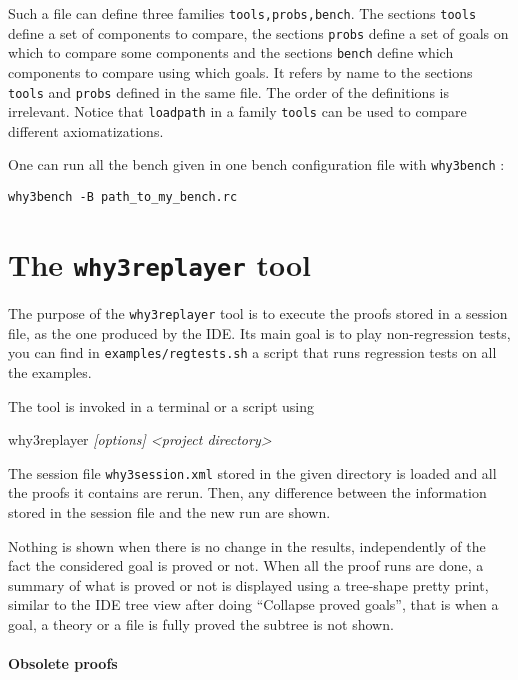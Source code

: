 Such a file can define three families \texttt{tools,probs,bench}. The
sections \texttt{tools} define a set of components to compare, the
sections \texttt{probs} define a set of goals on which to compare some
components and the sections \texttt{bench} define which components to
compare using which goals. It refers by name to the sections
\texttt{tools} and \texttt{probs} defined in the same file. The order
of the definitions is irrelevant. Notice that \texttt{loadpath} in a family
\texttt{tools} can be used to compare different axiomatizations.

One can run all the bench given in one bench configuration file with
\texttt{why3bench} :
\begin{verbatim}
why3bench -B path_to_my_bench.rc
\end{verbatim}

\section{The \texttt{why3replayer} tool}
\label{sec:why3replayer}

The purpose of the \texttt{why3replayer} tool is to execute the proofs
stored in a \why session file, as the one produced by the IDE. Its
main goal is to play non-regression tests, \eg you can find in
\texttt{examples/regtests.sh} a script that runs regression tests on
all the examples.

The tool is invoked in a terminal or a script using
\begin{flushleft}\ttfamily
  why3replayer \textsl{[options] <project directory>}
\end{flushleft}
The session file \texttt{why3session.xml} stored in the given
directory is loaded and all the proofs it contains are rerun. Then,
any difference between the information stored in the session file and
the new run are shown.

Nothing is shown when there is no change in the results, independently
of the fact the considered goal is proved or not. When all the proof
runs are done, a summary of what is proved or not is displayed using a
tree-shape pretty print, similar to the IDE tree view after doing
``Collapse proved goals'', that is when a goal, a theory or a file is
fully proved the subtree is not shown.

\paragraph{Obsolete proofs}

